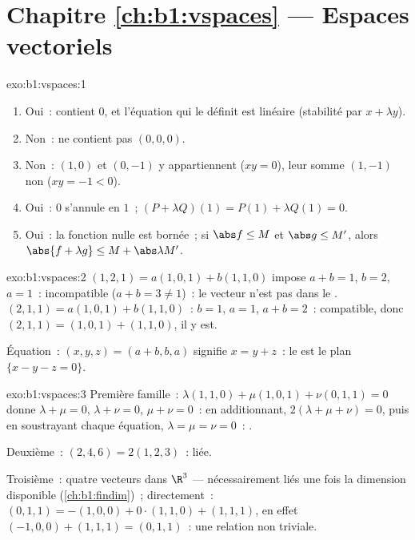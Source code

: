 \section*{Chapitre \ref{ch:b1:vspaces} --- Espaces vectoriels}

\begin{solution}{exo:b1:vspaces:1}
\begin{enumerate}
  \item Oui~: contient $0$, et l'équation qui le définit est linéaire
        (stabilité par $x + \lambda y$).
  \item Non~: ne contient pas $(0,0,0)$.
  \item Non~: $(1, 0)$ et $(0, -1)$ y appartiennent ($xy = 0$), leur
        somme $(1, -1)$ non ($xy = -1 < 0$).
  \item Oui~: $0$ s'annule en $1$~; $(P + \lambda Q)(1) = P(1) +
        \lambda Q(1) = 0$.
  \item Oui~: la fonction nulle est bornée~; si $\abs f \leq M$ et
        $\abs g \leq M'$, alors $\abs{f + \lambda g} \leq M +
        \abs\lambda M'$.
\end{enumerate}
\end{solution}

\begin{solution}{exo:b1:vspaces:2}
$(1,2,1) = a(1,0,1) + b(1,1,0)$ impose $a + b = 1$, $b = 2$, $a =
1$~: incompatible ($a + b = 3 \neq 1$)~: le vecteur n'est pas dans le
. $(2,1,1) =
a(1,0,1) + b(1,1,0)$~: $b = 1$, $a = 1$, $a + b = 2$~: compatible, donc
$(2,1,1) = (1,0,1) + (1,1,0)$, il y est.

Équation~: $(x, y, z) = (a + b, b, a)$ signifie $x = y + z$~: le
 est le plan $\{x - y - z = 0\}$.
\end{solution}

\begin{solution}{exo:b1:vspaces:3}
Première famille~: $\lambda(1,1,0) + \mu(1,0,1) + \nu(0,1,1) = 0$ donne
$\lambda + \mu = 0$, $\lambda + \nu = 0$, $\mu + \nu = 0$~: en
additionnant, $2(\lambda + \mu + \nu) = 0$, puis en soustrayant chaque
équation, $\lambda = \mu = \nu = 0$~: .

Deuxième~: $(2,4,6) = 2(1,2,3)$~: liée.

Troisième~: quatre vecteurs dans $\R^3$ --- nécessairement liés une
fois la dimension disponible (\cref{ch:b1:findim})~; directement~:
$(0,1,1) = -(1,0,0) + 0\cdot(1,1,0) + (1,1,1)$, en effet $(-1,0,0) +
(1,1,1) = (0,1,1)$~: une relation non triviale.
\end{solution}

